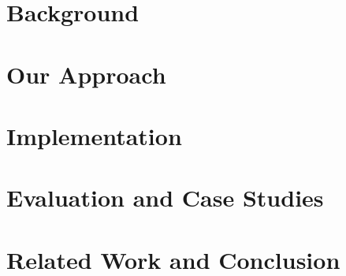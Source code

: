 \documentclass[runningheads]{llncs}
\begin{document}
\section{Background}
\label{s03}

\section{Our Approach}
\label{s3}


\section{Implementation}
\label{s4}


\section{Evaluation and Case Studies}
\label{s5}

\section{Related Work and Conclusion}



\end{document}
